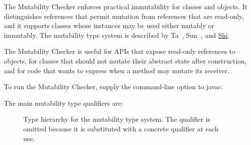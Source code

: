 \htmlhr
{}

The Mutability Checker enforces practical immutability for classes and objects.
It distinguishes references that permit mutation from references that are
read-only, and it supports classes whose instances may be used either
mutably or immutably.
The mutability type system is described by Ta~\cite{Ta2018},
Sun~\cite{Sun2021}, and
\href{https://uwspace.uwaterloo.ca/items/990ef07b-60be-420c-98ac-321ee7ad071c}{Shi}.

The Mutability Checker is useful for APIs that expose read-only references to objects, for classes
that should not mutate their abstract state after construction, and for
code that wants to express when a method may mutate its receiver.

To run the Mutability Checker, supply the
command-line option to javac.


The main mutability type qualifiers are:

\begin{figure}
\caption{Type hierarchy for the mutability type system.
  The  qualifier is omitted
  because it is substituted with a concrete qualifier at each use.}
\label{fig-mutability-hierarchy}
\end{figure}

